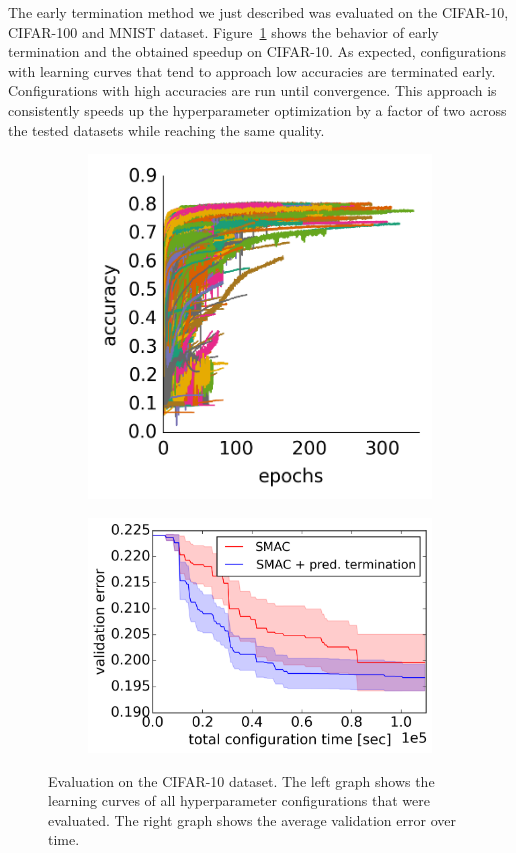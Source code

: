 The early termination method we just described was evaluated on the CIFAR-10, CIFAR-100 and MNIST dataset.
Figure~\ref{fig:earlyterm:eval} shows the behavior of early termination and the obtained speedup on CIFAR-10.
As expected, configurations with learning curves that tend to approach low accuracies are terminated early.
Configurations with high accuracies are run until convergence.
This approach is consistently speeds up the hyperparameter optimization by a factor of two across the tested datasets while reaching the same quality.
\begin{figure}
	\begin{subfigure}{0.4\textwidth}
		\centering
		\includegraphics[width=0.9\linewidth]{gfx/earlyterm/samples.png}
	\end{subfigure}
	\begin{subfigure}{0.6\textwidth}
		\centering
		\includegraphics[width=0.8\linewidth]{gfx/earlyterm/time.png}
	\end{subfigure}
	\caption{
		Evaluation on the CIFAR-10 dataset.
		The left graph shows the learning curves of all hyperparameter configurations that were evaluated.
		The right graph shows the average validation error over time.
	}\label{fig:earlyterm:eval}
\end{figure}
